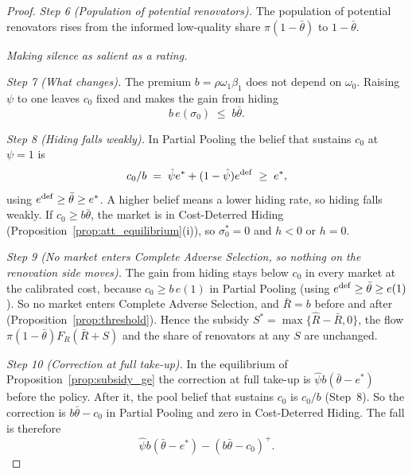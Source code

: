 \begin{proof}
\emph{Step 6 (Population of potential renovators).} The population of potential renovators rises from the informed low-quality share $\pi(1-\bar\theta)$ to $1-\bar\theta$.

\medskip\noindent\emph{Making silence as salient as a rating.}

\emph{Step 7 (What changes).} The premium $b=\rho\omega_1\beta_1$ does not depend on $\omega_0$. Raising $\psi$ to one leaves $c_0$ fixed and makes the gain from hiding
\begin{equation*}
    b\,e(\sigma_0)\;\le\;b\bar\theta.
\end{equation*}

\emph{Step 8 (Hiding falls weakly).} In Partial Pooling the belief that sustains $c_0$ at $\psi=1$ is
\begin{equation*}
    c_0/b\;=\;\hat\psi e^*+(1-\hat\psi)e^{\rm def}\;\ge\;e^*,
\end{equation*}
using $e^{\rm def}\ge\bar\theta\ge e^*$. A higher belief means a lower hiding rate, so hiding falls weakly. If $c_0\ge b\bar\theta$, the market is in Cost-Deterred Hiding (Proposition~\ref{prop:att_equilibrium}(i)), so $\sigma_0^*=0$ and $h<0$ or $h=0$.

\emph{Step 9 (No market enters Complete Adverse Selection, so nothing on the renovation side moves).} The gain from hiding stays below $c_0$ in every market at the calibrated cost, because $c_0\ge b\,e(1)$ in Partial Pooling (using $e^{\rm def}\ge\bar\theta\ge e(1)$). So no market enters Complete Adverse Selection, and $\bar R=b$ before and after (Proposition~\ref{prop:threshold}). Hence the subsidy $S^*=\max\{\hat R-\bar R,0\}$, the flow $\pi(1-\bar\theta)F_R(\bar R+S)$ and the share of renovators at any $S$ are unchanged.

\emph{Step 10 (Correction at full take-up).} In the equilibrium of Proposition~\ref{prop:subsidy_ge} the correction at full take-up is $\hat\psi b(\bar\theta-e^*)$ before the policy. After it, the pool belief that sustains $c_0$ is $c_0/b$ (Step~8). So the correction is $b\bar\theta-c_0$ in Partial Pooling and zero in Cost-Deterred Hiding. The fall is therefore
\begin{equation*}
    \hat\psi b(\bar\theta-e^*)-(b\bar\theta-c_0)^+.
\end{equation*}


\end{proof}

